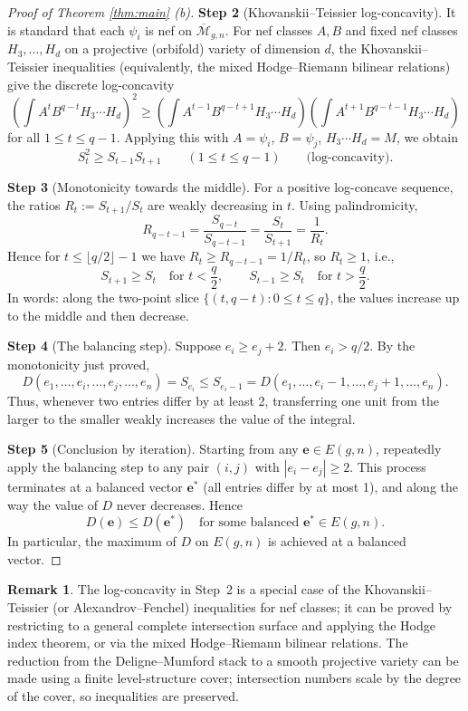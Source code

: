 \documentclass[12pt,reqno]{amsart}
\theoremstyle{definition}
\newtheorem{remark}[theorem]{Remark}
\newcommand{\humaninline}[1]{{\color{humancolor}\uwave{#1}}}
\newcommand{\Mbar}{\overline{\mathcal{M}}}
\newcommand{\ee}{\mathbf{e}}
\begin{document}
\begin{aiparagraph}
\begin{proof}[Proof of Theorem \ref{thm:main} (b)]
\medskip
\noindent\textbf{Step 2} (Khovanskii--Teissier log-concavity). It is standard that each $\psi_i$ is nef on $\Mbar_{g,n}$. For nef classes $A, B$ and fixed nef classes $H_3, \ldots, H_d$ on a projective (orbifold) variety of dimension $d$, the Khovanskii--Teissier inequalities \humaninline{as described in Variant 1.6.2 of \cite{MR2095471}} (equivalently, the mixed Hodge--Riemann bilinear relations) give the discrete log-concavity
\[
\left( \int A^t B^{q-t} H_3 \cdots H_d \right)^2 \geq \left( \int A^{t-1} B^{q-t+1} H_3 \cdots H_d \right) \left( \int A^{t+1} B^{q-t-1} H_3 \cdots H_d \right)
\]
for all $1 \leq t \leq q - 1$. Applying this with $A = \psi_i$, $B = \psi_j$, $H_3 \cdots H_d = M$, we obtain
\[
S_t^2 \geq S_{t-1} S_{t+1} \qquad (1 \leq t \leq q - 1) \qquad \text{(log-concavity)}.
\]

\medskip
\noindent\textbf{Step 3} (Monotonicity towards the middle). For a positive log-concave sequence, the ratios $R_t := S_{t+1}/S_t$ are weakly decreasing in $t$. Using palindromicity,
\[
R_{q-t-1} = \frac{S_{q-t}}{S_{q-t-1}} = \frac{S_t}{S_{t+1}} = \frac{1}{R_t}.
\]
Hence for $t \leq \lfloor q/2 \rfloor - 1$ we have $R_t \geq R_{q-t-1} = 1/R_t$, so $R_t \geq 1$, i.e.,
\[
S_{t+1} \geq S_t \quad \text{for } t < \frac{q}{2}, \qquad S_{t-1} \geq S_t \quad \text{for } t > \frac{q}{2}.
\]
In words: along the two-point slice $\{(t, q-t) : 0 \leq t \leq q\}$, the values increase up to the middle and then decrease.

\medskip
\noindent\textbf{Step 4} (The balancing step). Suppose $e_i \geq e_j + 2$. Then $e_i > q/2$. By the monotonicity just proved,
\[
D(e_1, \ldots, e_i, \ldots, e_j, \ldots, e_n) = S_{e_i} \leq S_{e_i - 1} = D(e_1, \ldots, e_i - 1, \ldots, e_j + 1, \ldots, e_n).
\]
Thus, whenever two entries differ by at least 2, transferring one unit from the larger to the smaller weakly increases the value of the integral.

\medskip
\noindent\textbf{Step 5} (Conclusion by iteration). Starting from any $\ee \in E(g,n)$, repeatedly apply the balancing step to any pair $(i,j)$ with $|e_i - e_j| \geq 2$. This process terminates at a balanced vector $\ee^*$ (all entries differ by at most 1), and along the way the value of $D$ never decreases. Hence
\[
D(\ee) \leq D(\ee^*) \quad \text{for some balanced } \ee^* \in E(g,n).
\]
In particular, the maximum of $D$ on $E(g,n)$ is achieved at a balanced vector.
\end{proof}

\begin{remark}
The log-concavity in Step~2 is a special case of the Khovanskii--Teissier (or Alexandrov--Fenchel) inequalities for nef classes; it can be proved by restricting to a general complete intersection surface and applying the Hodge index theorem, or via the mixed Hodge--Riemann bilinear relations. The reduction from the Deligne--Mumford stack to a smooth projective variety can be made using a finite level-structure cover; intersection numbers scale by the degree of the cover, so inequalities are preserved.
\end{remark}


\end{aiparagraph}
\end{document}
